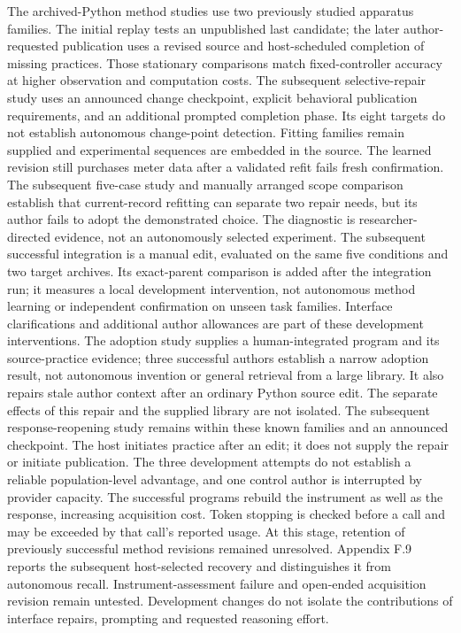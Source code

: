 \documentclass[11pt,a4paper]{article}
\begin{document}
The archived-Python method studies use two previously studied apparatus families.
The initial replay tests an unpublished last candidate; the later author-requested
publication uses a revised source and host-scheduled completion of missing practices.
Those stationary comparisons match fixed-controller accuracy at higher observation
and computation costs. The subsequent selective-repair study uses an announced
change checkpoint, explicit behavioral publication requirements, and an additional
prompted completion phase. Its eight targets do not establish autonomous change-point
detection. Fitting families remain supplied and experimental sequences are embedded
in the source. The learned revision still purchases meter data after a validated
refit fails fresh confirmation. The subsequent five-case study and manually
arranged scope comparison establish that current-record refitting can separate
two repair needs, but its author fails to adopt the demonstrated choice. The
diagnostic is researcher-directed evidence, not an autonomously selected experiment.
The subsequent successful integration is a manual edit, evaluated on the same
five conditions and two target archives. Its exact-parent comparison is added
after the integration run; it measures a local development intervention, not
autonomous method learning or independent confirmation on unseen task families.
Interface clarifications and additional author allowances are part of these
development interventions. The adoption study supplies a human-integrated program
and its source-practice evidence; three successful authors establish a narrow
adoption result, not autonomous invention or general retrieval from a large library.
It also repairs stale author context after an ordinary Python source edit. The
separate effects of this repair and the supplied library are not isolated.
The subsequent response-reopening study remains within these known families and
an announced checkpoint. The host initiates practice after an edit; it does not
supply the repair or initiate publication. The three development attempts do not
establish a reliable population-level advantage, and one control author is
interrupted by provider capacity. The successful programs rebuild the instrument
as well as the response, increasing acquisition cost. Token stopping is checked
before a call and may be exceeded by that call's reported usage. At this stage, retention of
previously successful method revisions remained unresolved. Appendix F.9 reports
the subsequent host-selected recovery and distinguishes it from autonomous recall.
Instrument-assessment failure and open-ended
acquisition revision remain untested. Development changes do not isolate the
contributions of interface repairs, prompting and requested reasoning effort.
\end{document}
